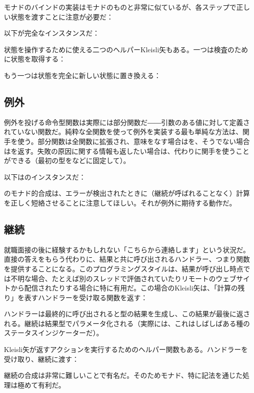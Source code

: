 モナドのバインドの実装はモナドのものと非常に似ているが、各ステップで正しい状態を渡すことに注意が必要だ：

以下が完全なインスタンスだ：

状態を操作するために使える二つのヘルパーKleisli矢もある。一つは検査のために状態を取得する：

もう一つは状態を完全に新しい状態に置き換える：


\subsection{例外}

例外を投げる命令型関数は実際には部分関数だ――引数のある値に対して定義されていない関数だ。純粋な全関数を使って例外を実装する最も単純な方法は、関手を使う。部分関数は全関数に拡張され、意味をなす場合はを、そうでない場合はを返す。失敗の原因に関する情報も返したい場合は、代わりに関手を使うことができる（最初の型をなどに固定して）。

以下はのインスタンスだ：

のモナド的合成は、エラーが検出されたときに（継続が呼ばれることなく）計算を正しく短絡させることに注意してほしい。それが例外に期待する動作だ。

\subsection{継続}

就職面接の後に経験するかもしれない「こちらから連絡します」という状況だ。直接の答えをもらう代わりに、結果と共に呼び出されるハンドラー、つまり関数を提供することになる。このプログラミングスタイルは、結果が呼び出し時点では不明な場合、たとえば別のスレッドで評価されていたりリモートのウェブサイトから配信されたりする場合に特に有用だ。この場合のKleisli矢は、「計算の残り」を表すハンドラーを受け取る関数を返す：

ハンドラーは最終的に呼び出されると型の結果を生成し、この結果が最後に返される。継続は結果型でパラメータ化される（実際には、これはしばしばある種のステータスインジケーターだ）。

Kleisli矢が返すアクションを実行するためのヘルパー関数もある。ハンドラーを受け取り、継続に渡す：

継続の合成は非常に難しいことで有名だ。そのためモナド、特に記法を通じた処理は極めて有利だ。


